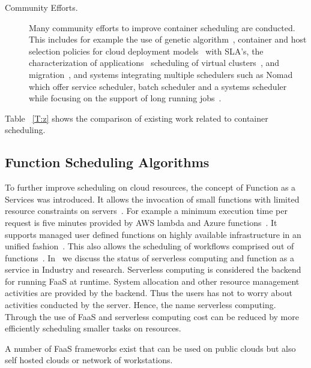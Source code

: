 \documentclass[final,5p,times,twocolumn]{elsarticle}
\begin{document}
\begin{description}
\item[Community Efforts.] Many community efforts to improve
container scheduling are conducted. This includes for example the use
of genetic algorithm~\cite{guerrero2018genetic}, container and host
selection policies for cloud deployment models~\cite{hanafy2017novel}
with SLA's, the characterization of
applications~\cite{medel2017client} scheduling of virtual
clusters~\cite{dziurzanskivalue}, and migration~\cite{Flocker2018},
and systems integrating multiple schedulers such as Nomad which offer
service scheduler, batch scheduler and a systems scheduler while
focusing on the support of long running jobs~\cite{Nomad2018}.

\end{description}


Table ~\ref{T:z} shows the comparison of existing work related to
container scheduling. 




%






\subsection{Function Scheduling Algorithms}
\label{sec:faas}



To further improve scheduling on cloud resources, the concept of
Function as a Services was introduced.  It allows the invocation of
small functions with limited resource constraints on
servers~\cite{lasbook}. For example a minimum execution time per
request is five minutes provided by AWS lambda and Azure
functions~\cite{ServerlessComputing2018}. It supports managed user
defined functions on highly available infrastructure in an unified
fashion~\cite{nastic2017serverless}. This also allows the scheduling of
workflows comprised out of
functions~\cite{alqaryouti2018serverless}. In~\cite{fox2017status} we
discuss the status of serverless computing and function as a service
in Industry and research.  Serverless computing is considered the
backend for running FaaS at runtime. System allocation and other
resource management activities are provided by the backend. Thus the
users has not to worry about activities conducted by the
server. Hence, the name serverless computing. Through the use of FaaS
and serverless computing cost can be reduced by more efficiently
scheduling smaller tasks on resources.

A number of FaaS frameworks exist that can be used on public clouds
but also self hosted clouds or network of workstations.
\end{document}
